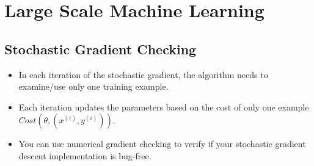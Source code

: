 

\section*{Large Scale Machine Learning}

\subsection*{Stochastic Gradient Checking}

\begin{itemize}
\item In each iteration of the stochastic gradient, the algorithm needs to examine/use only one training example.
\item Each iteration updates the parameters based on the cost of only one example $ Cost (\theta,(x^{(i)},y^{(i)}))$.
\item You can use numerical gradient checking to verify if your stochastic gradient descent implementation is bug-free.
\end{itemize}
